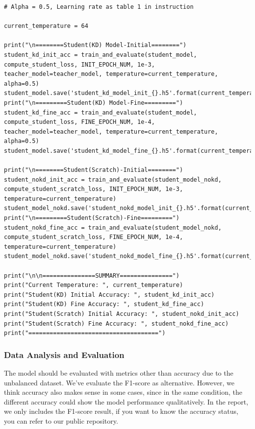 \documentclass[conference]{IEEEtran}
\begin{document}
\begin{lstlisting}
# Alpha = 0.5, Learning rate as table 1 in instruction

current_temperature = 64

print("\n========Student(KD) Model-Initial========")
student_kd_init_acc = train_and_evaluate(student_model, compute_student_loss, INIT_EPOCH_NUM, 1e-3, teacher_model=teacher_model, temperature=current_temperature, alpha=0.5)
student_model.save('student_kd_model_init_{}.h5'.format(current_temperature))
print("\n=========Student(KD) Model-Fine=========")
student_kd_fine_acc = train_and_evaluate(student_model, compute_student_loss, FINE_EPOCH_NUM, 1e-4, teacher_model=teacher_model, temperature=current_temperature, alpha=0.5)
student_model.save('student_kd_model_fine_{}.h5'.format(current_temperature))

print("\n========Student(Scratch)-Initial========")
student_nokd_init_acc = train_and_evaluate(student_model_nokd, compute_student_scratch_loss, INIT_EPOCH_NUM, 1e-3, temperature=current_temperature)
student_model_nokd.save('student_nokd_model_init_{}.h5'.format(current_temperature))
print("\n=========Student(Scratch)-Fine=========")
student_nokd_fine_acc = train_and_evaluate(student_model_nokd, compute_student_scratch_loss, FINE_EPOCH_NUM, 1e-4, temperature=current_temperature)
student_model_nokd.save('student_nokd_model_fine_{}.h5'.format(current_temperature))

print("\n\n===============SUMMARY===============")
print("Current Temperature: ", current_temperature)
print("Student(KD) Initial Accuracy: ", student_kd_init_acc)
print("Student(KD) Fine Accuracy: ", student_kd_fine_acc)
print("Student(Scratch) Initial Accuracy: ", student_nokd_init_acc)
print("Student(Scratch) Fine Accuracy: ", student_nokd_fine_acc)
print("=====================================")
\end{lstlisting}



\subsubsection{Data Analysis and Evaluation}

The model should be evaluated with metrics other than accuracy due to the unbalanced dataset. We've evaluate the F1-score as alternative. However, we think accuracy also makes sense in some cases, since in the same condition, the different accuracy could show the model performance qualitatively. In the report, we only includes the F1-score result, if you want to know the accuracy status, you can refer to our public repository.
\end{document}
